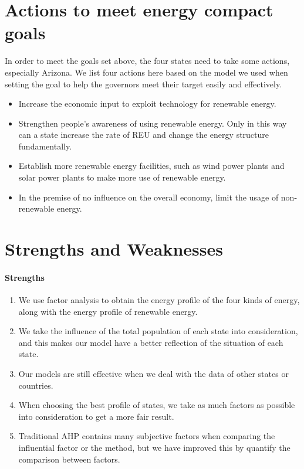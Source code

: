 \documentclass[a4paper,11pt]{article}
\begin{document}
\section{Actions to meet energy compact goals}
\par In order to meet the goals set above, the four states need to take some actions, especially Arizona. We list four actions here based on the model we used when setting the goal to help the governors meet their target easily and effectively.
\begin{itemize}
    \item Increase the economic input to exploit technology for renewable energy.
    \item Strengthen people's awareness of using renewable energy. Only in this way can a state increase the rate of REU and change the energy structure fundamentally.
    \item Establish more renewable energy facilities, such as wind power plants and solar power plants to make more use of renewable energy.
    \item In the premise of no influence on the overall economy, limit the usage of non-renewable energy.
\end{itemize}


\section{Strengths and Weaknesses}

\paragraph{Strengths}
\text{\\}
\begin{enumerate}%
\renewcommand{\labelenumi}{(\theenumi)}
    \item We use factor analysis to obtain the energy profile of the four kinds of energy, along with the energy profile of renewable energy.
    \item We take the influence of the total population of each state into consideration, and this makes our model have a better reflection of the situation of each state.
    \item Our models are still effective when we deal with the data of other states or countries.
    \item When choosing the best profile of states, we take as much factors as possible into consideration to get a more fair result.
    \item Traditional AHP contains many subjective factors when comparing the influential factor or the method, but we have improved this by quantify the comparison between factors.
\end{enumerate}
\end{document}
